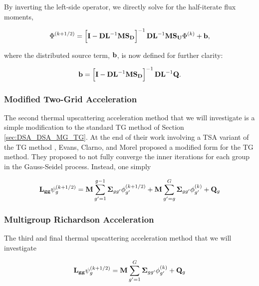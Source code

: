 \noindent By inverting the left-side operator, we directly solve for the half-iterate flux moments,

\begin{equation}
\label{eq::DSA_TG_half_it_sol}
\Phi^{(k+1/2)} = \left[ {\bf I} - {\bf D}{\bf L}^{-1} {\bf M} {\bf S_D} \right]^{-1} {\bf D}{\bf L}^{-1}  {\bf M} {\bf S_U} \Phi^{(k)} + {\bf b} ,
\end{equation}

\noindent where the distributed source term, ${\bf b}$, is now defined for further clarity:

\begin{equation}
\label{eq::DSA_TG_half_it_forcingfunc}
{\bf b} = \left[ {\bf I} - {\bf D}{\bf L}^{-1} {\bf M} {\bf S_D} \right]^{-1} {\bf D}{\bf L}^{-1}  {\bf Q} .
\end{equation}

\subsubsection{Modified Two-Grid Acceleration}
\label{sec:DSA_DSA_MG_MTG}

The second thermal upscattering acceleration method that we will investigate is a simple modification to the standard TG method of Section \ref{sec:DSA_DSA_MG_TG}. At the end of their work involving a TSA variant of the TG method \cite{evans2010transport}, Evans, Clarno, and Morel proposed a modified form for the TG method. They proposed to not fully converge the inner iterations for each group in the Gauss-Seidel process. Instead, one simply 

\begin{equation}
\label{eq::DSA_MTG_trans_it_eq}
{\bf L_{gg}} \psi_g^{(k+1/2)} = {\bf M} \sum_{g'=1}^{g-1} {\bf \Sigma}_{g g'} \phi_{g'}^{(k+1/2)} + {\bf M} \sum_{g'=g}^G {\bf \Sigma}_{g g'} \phi_{g'}^{(k)} + {\bf Q}_g
\end{equation}

\subsubsection{Multigroup Richardson Acceleration}
\label{sec:DSA_DSA_MG_WGS}

The third and final thermal upscattering acceleration method that we will investigate 

\begin{equation}
\label{eq::DSA_WGS_trans_it_eq}
{\bf L_{gg}} \psi_g^{(k+1/2)} =  {\bf M} \sum_{g'=1}^G {\bf \Sigma}_{g g'} \phi_{g'}^{(k)} + {\bf Q}_g
\end{equation}



